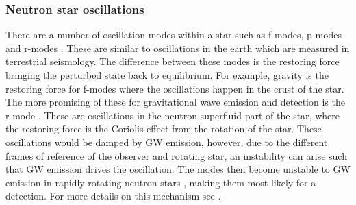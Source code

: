 \subsubsection{Neutron star oscillations}
There are a number of oscillation modes within a star such as f-modes, p-modes
and r-modes \citep{becker2009NeutronStars}.  These are similar to oscillations
in the earth which are measured in terrestrial seismology.  The difference
between these modes is the restoring force bringing the perturbed state back to
equilibrium.  For example, gravity is the restoring force for f-modes where the
oscillations happen in the crust of the star.  The more promising of these for
gravitational wave emission and detection is the r-mode
\citep{owen2000GravitationalWaves}.
These are oscillations in the neutron superfluid part of the star, where the
restoring force is the Coriolis effect from the rotation of the star.  
These oscillations would be damped by \gls{GW} emission, however, due to the different frames of reference of the observer and rotating star, an instability can arise such that \gls{GW} emission drives the oscillation. 
The modes then become unstable to \gls{GW} emission in rapidly rotating neutron
stars \citep{owen2000GravitationalWaves}, making them most likely for a
detection.  For more details on this mechanism see
\citep{owen2000GravitationalWaves,lasky2015GravitationalWaves,owen1998GravitationalWaves,jonesCFSInstability}.~


